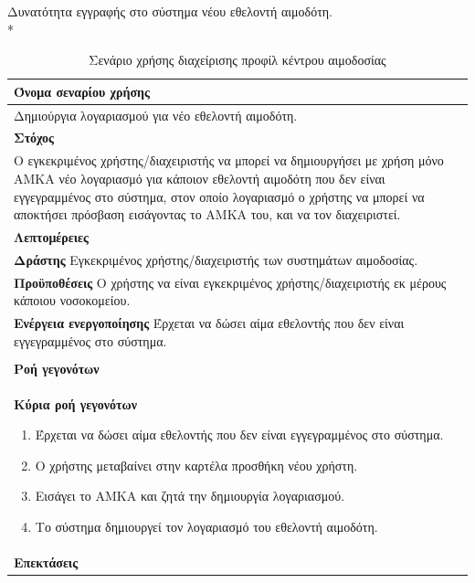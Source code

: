 Δυνατότητα εγγραφής στο σύστημα νέου εθελοντή αιμοδότη.
\\*	

\begin{table}[H]
	\begin{center}
	    \begin{tabular}{|p{\dimexpr \linewidth-2\tabcolsep}|}
	    \hline
	    \rowcolor{grayy}
	    \textbf{Όνομα σεναρίου χρήσης}
	    \\ \hline    
	    Δημιούργια λογαριασμού για νέο εθελοντή αιμοδότη.
	     \\ \hline
	    \rowcolor{grayy}
	    \textbf{\textbf{Στόχος}}
	    \\ \hline
	 	 Ο εγκεκριμένος χρήστης/διαχειριστής να μπορεί να δημιουργήσει με χρήση μόνο ΑΜΚΑ νέο λογαριασμό για κάποιον εθελοντή αιμοδότη που δεν είναι εγγεγραμμένος στο σύστημα, στον οποίο λογαριασμό ο χρήστης να μπορεί να αποκτήσει πρόσβαση εισάγοντας το ΑΜΚΑ του, και να τον διαχειριστεί.
	    \\ \hline
	    \rowcolor{grayy}
	    \textbf{Λεπτομέρειες}
	    \\ \hline
		\textbf{Δράστης} Εγκεκριμένος χρήστης/διαχειριστής των συστημάτων αιμοδοσίας.
		\\*
		\textbf{Προϋποθέσεις} Ο χρήστης να είναι εγκεκριμένος χρήστης/διαχειριστής εκ μέρους κάποιου νοσοκομείου.
		\\*
		\textbf{Ενέργεια ενεργοποίησης} Έρχεται να δώσει αίμα εθελοντής που δεν είναι εγγεγραμμένος στο σύστημα.
		\\ \hline
	    \\ \hline
		\rowcolor{grayy}    
	    \textbf{Ροή γεγονότων}
	    \\* 
		\textbf{Κύρια ροή γεγονότων}
		\begin{enumerate}
			\item	 Έρχεται να δώσει αίμα εθελοντής που δεν είναι εγγεγραμμένος στο σύστημα.
			\item Ο χρήστης μεταβαίνει στην καρτέλα προσθήκη νέου χρήστη.
			\item Εισάγει το ΑΜΚΑ και ζητά την δημιουργία λογαριασμού.
			\item Το σύστημα δημιουργεί τον λογαριασμό του εθελοντή αιμοδότη.
		\end{enumerate}
		\\*
		\textbf{Επεκτάσεις}
		   \\ \hline
	    \end{tabular}
	    \caption{Σενάριο χρήσης διαχείρισης προφίλ κέντρου αιμοδοσίας}
	    \label{tab:create_new_donor_account}
	\end{center}
\end{table}	



